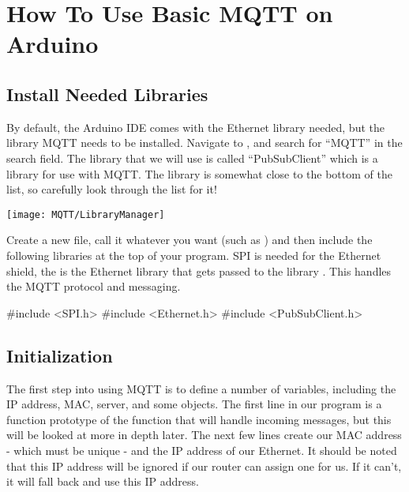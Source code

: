 %
%


\chapter{How To Use Basic MQTT on Arduino}

\section{Install Needed Libraries}


By default, the Arduino IDE comes with the Ethernet library  needed, but the  library MQTT needs to be installed. Navigate to , and search for ``MQTT'' in the search field. The library that we will use is called ``PubSubClient'' which is a library for use with MQTT. The library is somewhat close to the bottom of the list, so carefully look through the list for it!

\bigskip

\begin{center}
\texttt{[image: MQTT/LibraryManager]}
\end{center}

\bigskip

Create a new file, call it whatever you want (such as ) and then include the following libraries at the top of your program. SPI is needed for the Ethernet shield, the  is the Ethernet library that gets passed to the library . This handles the MQTT protocol and messaging.

\bigskip

\begin{Arduino}
#include <SPI.h>
#include <Ethernet.h>
#include <PubSubClient.h>
\end{Arduino}

\section{Initialization}

The first step into using MQTT is to define a number of variables, including the IP address, MAC, server, and some objects. The first line in our program is a function prototype of the function that will handle incoming messages, but this will be looked at more in depth later. The next few lines create our MAC address - which must be unique - and the IP address of our Ethernet. It should be noted that this IP address will be ignored if our router can assign one for us. If it can't, it will fall back and use this IP address.

